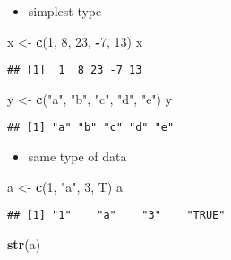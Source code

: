 \documentclass[
  a4paper,
]{article}
\newenvironment{Shaded}{\begin{snugshade}}{\end{snugshade}}
\newcommand{\DecValTok}[1]{\textcolor[rgb]{0.00,0.00,0.81}{#1}}
\newcommand{\FunctionTok}[1]{\textcolor[rgb]{0.13,0.29,0.53}{\textbf{#1}}}
\newcommand{\NormalTok}[1]{#1}
\newcommand{\OtherTok}[1]{\textcolor[rgb]{0.56,0.35,0.01}{#1}}
\newcommand{\SpecialCharTok}[1]{\textcolor[rgb]{0.81,0.36,0.00}{\textbf{#1}}}
\newcommand{\StringTok}[1]{\textcolor[rgb]{0.31,0.60,0.02}{#1}}
\providecommand{\tightlist}{%
  \setlength{\itemsep}{0pt}\setlength{\parskip}{0pt}}
\begin{document}
\begin{itemize}
\tightlist
\item
  simplest type
\end{itemize}

\begin{Shaded}
\begin{Highlighting}[]
\NormalTok{x }\OtherTok{\textless{}{-}} \FunctionTok{c}\NormalTok{(}\DecValTok{1}\NormalTok{, }\DecValTok{8}\NormalTok{, }\DecValTok{23}\NormalTok{, }\SpecialCharTok{{-}}\DecValTok{7}\NormalTok{, }\DecValTok{13}\NormalTok{)}
\NormalTok{x}
\end{Highlighting}
\end{Shaded}

\begin{verbatim}
## [1]  1  8 23 -7 13
\end{verbatim}

\begin{Shaded}
\begin{Highlighting}[]
\NormalTok{y }\OtherTok{\textless{}{-}} \FunctionTok{c}\NormalTok{(}\StringTok{"a"}\NormalTok{, }\StringTok{"b"}\NormalTok{, }\StringTok{"c"}\NormalTok{, }\StringTok{"d"}\NormalTok{, }\StringTok{"e"}\NormalTok{)}
\NormalTok{y}
\end{Highlighting}
\end{Shaded}

\begin{verbatim}
## [1] "a" "b" "c" "d" "e"
\end{verbatim}

\begin{itemize}
\tightlist
\item
  same type of data
\end{itemize}

\begin{Shaded}
\begin{Highlighting}[]
\NormalTok{a }\OtherTok{\textless{}{-}} \FunctionTok{c}\NormalTok{(}\DecValTok{1}\NormalTok{, }\StringTok{"a"}\NormalTok{, }\DecValTok{3}\NormalTok{, T)}
\NormalTok{a}
\end{Highlighting}
\end{Shaded}

\begin{verbatim}
## [1] "1"    "a"    "3"    "TRUE"
\end{verbatim}

\begin{Shaded}
\begin{Highlighting}[]
\FunctionTok{str}\NormalTok{(a)}
\end{Highlighting}
\end{Shaded}
\end{document}
